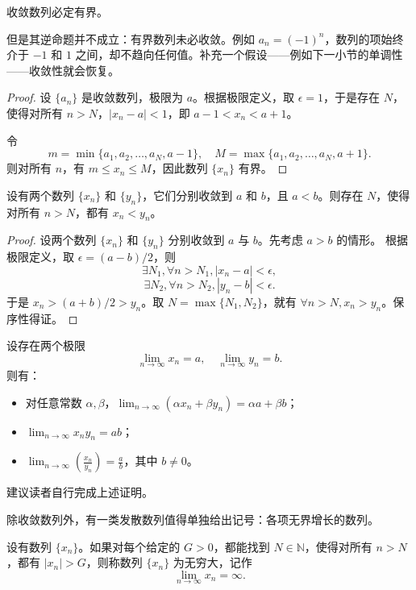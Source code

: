 \begin{theorem}
收敛数列必定有界。
\end{theorem}
\begin{remark}
但是其逆命题并不成立：有界数列未必收敛。例如 $a_n=(-1)^n$，数列的项始终介于 $-1$ 和 $1$ 之间，却不趋向任何值。补充一个假设——例如下一小节的单调性——收敛性就会恢复。
\end{remark}

\begin{proof}
设 $\{a_n\}$ 是收敛数列，极限为 $a$。根据极限定义，取 $\epsilon=1$，于是存在 $N$，使得对所有 $n>N$，$|x_n-a|<1$，即 $a-1<x_n<a+1$。

令
\[
m=\min\{a_1,a_2,\dots,a_N,a-1\},\quad M=\max\{a_1,a_2,\dots,a_N,a+1\}.
\]
则对所有 $n$，有 $m\le x_n\le M$，因此数列 $\{x_n\}$ 有界。
\end{proof}

\begin{theorem}[保序性]
设有两个数列 $\{x_n\}$ 和 $\{y_n\}$，它们分别收敛到 $a$ 和 $b$，且 $a<b$。则存在 $N$，使得对所有 $n>N$，都有 $x_n<y_n$。
\end{theorem}

\begin{proof}
设两个数列 $\{x_n\}$ 和 $\{y_n\}$ 分别收敛到 $a$ 与 $b$。先考虑 $a>b$ 的情形。
根据极限定义，取 $\epsilon=(a-b)/2$，则
\[
\exists N_1,\forall n>N_1, |x_n-a|<\epsilon,
\]
\[
\exists N_2,\forall n>N_2, |y_n-b|<\epsilon.
\]
于是 $x_n>(a+b)/2>y_n$。取 $N=\max\{N_1,N_2\}$，就有 $\forall n>N,x_n>y_n$。保序性得证。
\end{proof}

\begin{theorem}[极限的运算法则]
设存在两个极限
\[
\lim_{n\to \infty}x_n=a,\quad \lim_{n\to \infty}y_n=b.
\]
则有：
\begin{itemize}
    \item 对任意常数 $\alpha,\beta$，$\lim_{n\to \infty}(\alpha x_n+\beta y_n)=\alpha a+\beta b$；
    \item $\lim_{n\to \infty}x_ny_n=ab$；
    \item $\lim_{n\to \infty}\left(\frac{x_n}{y_n}\right)=\frac{a}{b}$，其中 $b\ne 0$。
\end{itemize}
\end{theorem}
建议读者自行完成上述证明。

除收敛数列外，有一类发散数列值得单独给出记号：各项无界增长的数列。

\begin{definition}[无穷大]
设有数列 $\{x_n\}$。如果对每个给定的 $G>0$，都能找到 $N\in \mathbb{N}$，使得对所有 $n>N$，都有 $|x_n|>G$，则称数列 $\{x_n\}$ 为无穷大，记作
\[
\lim_{n\to \infty}x_n=\infty.
\]
\end{definition}

